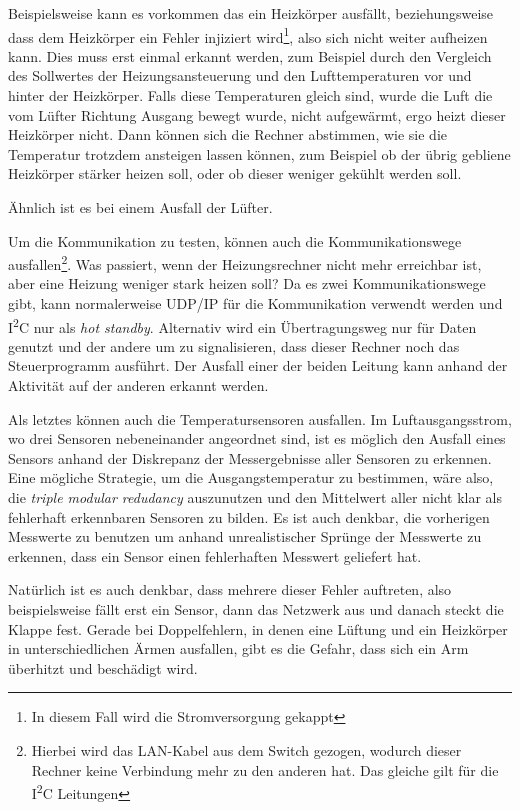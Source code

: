 Beispielsweise kann es vorkommen das ein Heizk{\"{o}}rper ausf{\"{a}}llt, beziehungsweise dass dem
Heizk{\"{o}}rper ein Fehler injiziert wird\footnote{In diesem Fall wird die Stromversorgung gekappt},
also sich nicht weiter aufheizen kann. Dies muss erst einmal erkannt werden, zum Beispiel
durch den Vergleich des Sollwertes der Heizungsansteuerung und den Lufttemperaturen vor und hinter der Heizk{\"{o}}rper. Falls diese Temperaturen gleich sind,
wurde die Luft die vom L{\"{u}}fter Richtung Ausgang bewegt wurde, nicht aufgew{\"{a}}rmt, ergo heizt dieser Heizk{\"{o}}rper nicht. Dann k{\"{o}}nnen sich die
Rechner abstimmen, wie sie die Temperatur trotzdem ansteigen lassen k{\"{o}}nnen, zum Beispiel ob der {\"{u}}brig gebliene Heizk{\"{o}}rper st{\"{a}}rker heizen
soll, oder ob dieser weniger gek{\"{u}}hlt werden soll.

{\"{A}}hnlich ist es bei einem Ausfall der L{\"{u}}fter. 

Um die Kommunikation zu testen, k{\"{o}}nnen auch die Kommunikationswege ausfallen\footnote{Hierbei
wird das LAN-Kabel aus dem Switch gezogen, wodurch dieser Rechner keine Verbindung mehr zu den anderen hat.
Das gleiche gilt f{\"{u}}r die I\textsuperscript{2}C Leitungen}.
Was passiert, wenn der Heizungsrechner nicht mehr erreichbar ist, aber eine Heizung weniger stark heizen soll?
Da es zwei Kommunikationswege gibt, kann normalerweise UDP/IP f{\"{u}}r die Kommunikation verwendt werden
und I\textsuperscript{2}C nur als \textit{hot standby}. Alternativ wird ein {\"{U}}bertragungsweg nur
f{\"{u}}r Daten genutzt und der andere um zu signalisieren, dass dieser Rechner noch das
Steuerprogramm ausf{\"{u}}hrt. Der Ausfall einer der beiden Leitung kann anhand der Aktivit{\"{a}}t auf der
anderen erkannt werden.

Als letztes k{\"{o}}nnen auch die Temperatursensoren ausfallen. Im Luftausgangsstrom, wo drei Sensoren 
nebeneinander angeordnet sind, ist es m{\"{o}}glich den
Ausfall eines Sensors anhand der Diskrepanz der Messergebnisse aller Sensoren zu erkennen. Eine m{\"{o}}gliche 
Strategie, um die Ausgangstemperatur zu
bestimmen, w{\"{a}}re also, die \textit{triple modular redudancy} auszunutzen und den Mittelwert aller nicht klar als 
fehlerhaft erkennbaren Sensoren zu bilden.
Es ist auch denkbar, die vorherigen Messwerte zu benutzen um anhand unrealistischer Spr{\"{u}}nge der Messwerte zu 
erkennen, dass ein Sensor einen fehlerhaften Messwert geliefert hat.

Nat{\"{u}}rlich ist es auch denkbar, dass mehrere dieser Fehler auftreten, also beispielsweise f{\"{a}}llt
erst ein Sensor, dann das Netzwerk aus und danach steckt die Klappe fest.
Gerade bei Doppelfehlern, in denen eine L{\"{u}}ftung und ein Heizk{\"{o}}rper in unterschiedlichen {\"{A}}rmen 
ausfallen, gibt es die Gefahr, dass sich ein Arm {\"{u}}berhitzt und besch{\"{a}}digt wird.

